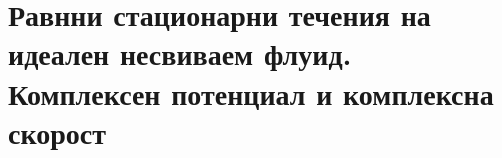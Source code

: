\section{Равнни стационарни течения на идеален несвиваем флуид. Комплексен потенциал и комплексна скорост}

